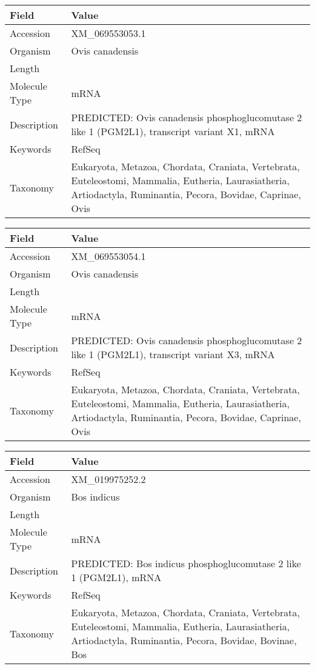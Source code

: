 \documentclass[10pt]{article}
\begin{document}
{\footnotesize
\begin{longtable}{>{\raggedright\arraybackslash}p{4.5cm} >{\raggedright\arraybackslash}p{11.5cm}}
\textbf{Field} & \textbf{Value} \\
\hline
Accession & XM\_069553053.1 \\
Organism & Ovis canadensis \\
Length & 3150 \\
Molecule Type & mRNA \\
Description & PREDICTED: Ovis canadensis phosphoglucomutase 2 like 1 (PGM2L1), transcript variant X1, mRNA \\
Keywords & RefSeq \\
Taxonomy & Eukaryota, Metazoa, Chordata, Craniata, Vertebrata, Euteleostomi, Mammalia, Eutheria, Laurasiatheria, Artiodactyla, Ruminantia, Pecora, Bovidae, Caprinae, Ovis \\
\end{longtable}
}

{\footnotesize
\begin{longtable}{>{\raggedright\arraybackslash}p{4.5cm} >{\raggedright\arraybackslash}p{11.5cm}}
\textbf{Field} & \textbf{Value} \\
\hline
Accession & XM\_069553054.1 \\
Organism & Ovis canadensis \\
Length & 4726 \\
Molecule Type & mRNA \\
Description & PREDICTED: Ovis canadensis phosphoglucomutase 2 like 1 (PGM2L1), transcript variant X3, mRNA \\
Keywords & RefSeq \\
Taxonomy & Eukaryota, Metazoa, Chordata, Craniata, Vertebrata, Euteleostomi, Mammalia, Eutheria, Laurasiatheria, Artiodactyla, Ruminantia, Pecora, Bovidae, Caprinae, Ovis \\
\end{longtable}
}

{\footnotesize
\begin{longtable}{>{\raggedright\arraybackslash}p{4.5cm} >{\raggedright\arraybackslash}p{11.5cm}}
\textbf{Field} & \textbf{Value} \\
\hline
Accession & XM\_019975252.2 \\
Organism & Bos indicus \\
Length & 7802 \\
Molecule Type & mRNA \\
Description & PREDICTED: Bos indicus phosphoglucomutase 2 like 1 (PGM2L1), mRNA \\
Keywords & RefSeq \\
Taxonomy & Eukaryota, Metazoa, Chordata, Craniata, Vertebrata, Euteleostomi, Mammalia, Eutheria, Laurasiatheria, Artiodactyla, Ruminantia, Pecora, Bovidae, Bovinae, Bos \\
\end{longtable}
}
\end{document}
